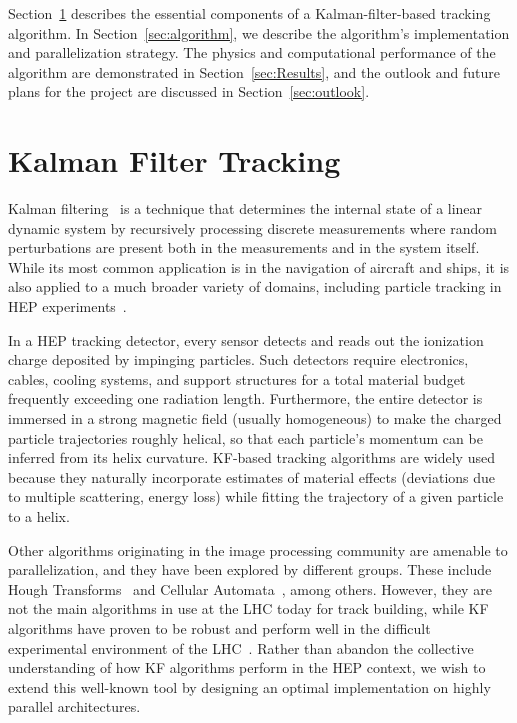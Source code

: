 \documentclass[a4paper,11pt]{article}
\begin{document}
Section~\ref{sec:kalman_intro} describes the essential components of a Kalman-filter-based tracking algorithm. In Section~\ref{sec:algorithm}, we describe the algorithm's implementation and parallelization strategy.
The physics and computational performance of the algorithm are demonstrated in Section~\ref{sec:Results}, and the outlook and future plans for the project are discussed in Section~\ref{sec:outlook}.

\section{Kalman Filter Tracking}
\label{sec:kalman_intro}

Kalman filtering~\cite{Kalman1960} is a technique that determines the internal state of a linear dynamic system by recursively processing discrete measurements where random perturbations are present both in the measurements and in the system itself. While its most common application is in the navigation of aircraft and ships, it is also applied to a much broader variety of domains, including particle tracking in HEP experiments~\cite{Fruhwirth:1987fm}. 

In a HEP tracking detector, every sensor detects and reads out the ionization charge deposited by impinging particles. Such detectors require electronics, cables, cooling systems, and support structures for a total material budget frequently exceeding one radiation length. Furthermore, the entire detector is immersed in a strong magnetic field (usually homogeneous) to make the charged particle trajectories roughly helical, so that each particle's momentum can be inferred from its helix curvature. KF-based tracking algorithms are widely used because they naturally incorporate estimates of material effects (deviations due to multiple scattering, energy loss) while fitting the trajectory of a given particle to a helix.

Other algorithms originating in the image processing community are amenable to parallelization, and they have been explored by different groups. These include Hough Transforms~\cite{Halyo:2013gja} and Cellular Automata~\cite{Pantaleo:2293435}, among others. However, they are not the main algorithms in use at the LHC today for track building, while KF algorithms have proven to be robust and perform well in the difficult experimental environment of the LHC~\cite{Chatrchyan:2014fea,Aaboud:2017all}. Rather than abandon the collective understanding of how KF algorithms perform in the HEP context, we wish to extend this well-known tool by designing an optimal implementation on highly parallel architectures.
\end{document}
